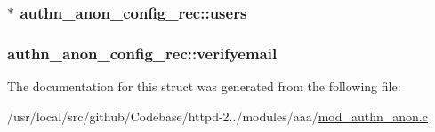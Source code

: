 \subsubsection[{\texorpdfstring{users}{users}}]{$\ast$ authn\+\_\+anon\+\_\+config\+\_\+rec\+::users}\hypertarget{structauthn__anon__config__rec_a0e299393b6d41b73088657ebb22888c7}{}\label{structauthn__anon__config__rec_a0e299393b6d41b73088657ebb22888c7}
\subsubsection[{\texorpdfstring{verifyemail}{verifyemail}}]{ authn\+\_\+anon\+\_\+config\+\_\+rec\+::verifyemail}\hypertarget{structauthn__anon__config__rec_a22896716e371a7a18b26755e583acef9}{}\label{structauthn__anon__config__rec_a22896716e371a7a18b26755e583acef9}


The documentation for this struct was generated from the following file\+:\begin{DoxyCompactItemize}
\item 
/usr/local/src/github/\+Codebase/httpd-\/2../modules/aaa/\hyperlink{mod__authn__anon_8c}{mod\+\_\+authn\+\_\+anon.\+c}\end{DoxyCompactItemize}
